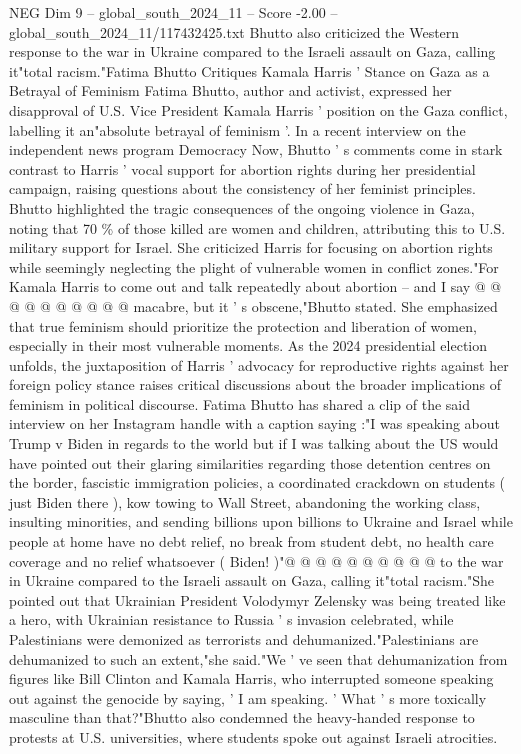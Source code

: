 \begin{textsample}{NEG Dim 9 – global\_south\_2024\_11 – Score -2.00 – global\_south\_2024\_11/117432425.txt}  \label{ex:f9_neg_308}
Bhutto also criticized the Western response to the war in Ukraine compared to the Israeli assault on Gaza, calling it"total racism."Fatima Bhutto Critiques Kamala Harris ' Stance on Gaza as a Betrayal of Feminism Fatima Bhutto, author and activist, expressed her disapproval of U.S.
Vice President Kamala Harris ' position on the Gaza conflict, labelling it an"absolute betrayal of feminism '.
In a recent interview on the independent news program Democracy Now, Bhutto ' s comments come in stark contrast to Harris ' vocal support for abortion rights during her presidential campaign, raising questions about the consistency of her feminist principles.
Bhutto highlighted the tragic consequences of the ongoing violence in Gaza, noting that 70 \% of those killed are women and children, attributing this to U.S. military support for Israel.
She criticized Harris for focusing on abortion rights while seemingly neglecting the plight of vulnerable women in conflict zones."For Kamala Harris to come out and talk repeatedly about abortion -- and I say @ @ @ @ @ @ @ @ @ @ macabre, but it ' s obscene,"Bhutto stated.
She emphasized that true feminism should prioritize the protection and liberation of women, especially in their most vulnerable moments.
As the 2024 presidential election unfolds, the juxtaposition of Harris ' advocacy for reproductive rights against her foreign policy stance raises critical discussions about the broader implications of feminism in political discourse.
Fatima Bhutto has shared a clip of the said interview on her Instagram handle with a caption saying :"I was speaking about Trump v Biden in regards to the world but if I was talking about the US would have pointed out their glaring similarities regarding those detention centres on the border, fascistic immigration policies, a coordinated crackdown on students ( just Biden there ), kow towing to Wall Street, abandoning the working class, insulting minorities, and sending billions upon billions to Ukraine and Israel while people at home have no debt relief, no break from student debt, no health care coverage and no relief whatsoever ( Biden! )"@ @ @ @ @ @ @ @ @ @ to the war in Ukraine compared to the Israeli assault on Gaza, calling it"total racism."She pointed out that Ukrainian President Volodymyr Zelensky was being treated like a hero, with Ukrainian resistance to Russia ' s invasion celebrated, while Palestinians were demonized as terrorists and dehumanized."Palestinians are dehumanized to such an extent,"she said."We ' ve seen that dehumanization from figures like Bill Clinton and Kamala Harris, who interrupted someone speaking out against the genocide by saying, ' I am speaking. ' What ' s more toxically masculine than that?"Bhutto also condemned the heavy-handed response to protests at U.S. universities, where students spoke out against Israeli atrocities.

\end{textsample}
